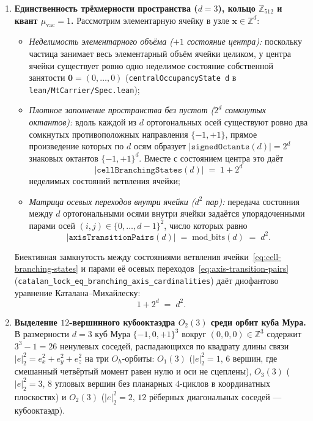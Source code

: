 \documentclass[11pt,a4paper]{article}
\theoremstyle{plain}
\theoremstyle{definition}
\begin{document}
\begin{enumerate}[label=\textbf{Шаг \arabic*.},leftmargin=*]
\item \textbf{Единственность трёхмерности пространства ($d = 3$), кольцо $\mathbb{Z}_{512}$ и квант $\mu_{\mathrm{vac}} = 1$.}
  Рассмотрим элементарную ячейку в узле $\mathbf{x}\in\mathbb{Z}^d$:
  \begin{itemize}[leftmargin=*]
  \item \emph{Неделимость элементарного объёма ($+1$ состояние центра):} поскольку частица занимает весь элементарный объём ячейки целиком, у центра ячейки существует ровно одно неделимое состояние собственной занятости $\mathbf{0} = (0,\dots,0)$ (\texttt{centralOccupancyState d} в \texttt{lean/MtCarrier/Spec.lean});
  \item \emph{Плотное заполнение пространства без пустот ($2^d$ сомкнутых октантов):} вдоль каждой из $d$ ортогональных осей существуют ровно два сомкнутых противоположных направления $\{-1,+1\}$, прямое произведение которых по $d$ осям образует $|\texttt{signedOctants}(d)| = 2^d$ знаковых октантов $\{-1,+1\}^d$. Вместе с состоянием центра это даёт
    \begin{equation}
      \label{eq:cell-branching-states}
      |\texttt{cellBranchingStates}(d)| \;=\; 1 + 2^d
    \end{equation}
    неделимых состояний ветвления ячейки;
  \item \emph{Матрица осевых переходов внутри ячейки ($d^2$ пар):} передача состояния между $d$ ортогональными осями внутри ячейки задаётся упорядоченными парами осей $(i,j)\in\{0,\dots,d-1\}^2$, число которых равно
    \begin{equation}
      \label{eq:axis-transition-pairs}
      |\texttt{axisTransitionPairs}(d)| \;=\; \mathrm{mod\_bits}(d) \;=\; d^2.
    \end{equation}
  \end{itemize}
  Биективная замкнутость между состояниями ветвления ячейки~\eqref{eq:cell-branching-states} и парами её осевых переходов~\eqref{eq:axis-transition-pairs} (\texttt{catalan\_lock\_eq\_branching\_axis\_cardinalities}) даёт диофантово уравнение Каталана--Михайлеску:
  \begin{equation}
    \label{eq:catalan-lock}
    1 + 2^d \;=\; d^2.
  \end{equation}

\item \textbf{Выделение $12$-вершинного кубооктаэдра $O_2(3)$ среди орбит куба Мура.}
  В размерности $d = 3$ куб Мура $\{-1,0,+1\}^3$ вокруг $(0,0,0)\in\mathbb{Z}^3$ содержит $3^3 - 1 = 26$ ненулевых соседей, распадающихся по квадрату длины связи $|e|_2^2 = e_x^2 + e_y^2 + e_z^2$ на три $O_h$-орбиты: $O_1(3)$ ($|e|_2^2 = 1$, $6$ вершин, где смешанный четвёртый момент равен нулю и оси не сцеплены), $O_3(3)$ ($|e|_2^2 = 3$, $8$ угловых вершин без планарных $4$-циклов в координатных плоскостях) и $O_2(3)$ ($|e|_2^2 = 2$, $12$ рёберных диагональных соседей --- кубооктаэдр).


\end{enumerate}
\end{document}

